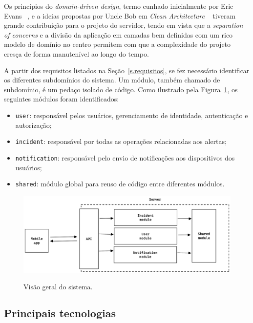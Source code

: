 Os princípios do \emph{domain-driven design}, termo cunhado inicialmente por Eric Evans ~\cite{domain-driven-design}, e a ideias propostas por Uncle Bob em \emph{Clean Architecture} ~\cite{clean-architecture} tiveram grande contribuição para o projeto do servidor, tendo em vista que a \emph{separation of concerns} e a divisão da aplicação em camadas bem definidas com um rico modelo de domínio no centro permitem com que a complexidade do projeto cresça de forma manutenível ao longo do tempo.

A partir dos requisitos listados na Seção~\ref{s.requisitos}, se fez necessário identificar os diferentes subdomínios do sistema. Um módulo, também chamado de subdomínio, é um pedaço isolado de código. Como ilustrado pela Figura~\ref{f.system_server}, os seguintes módulos foram identificados:

\begin{itemize}
	\item \texttt{user}: responsável pelos usuários, gerenciamento de identidade, autenticação e autorização;
	\item \texttt{incident}: responsável por todas as operações relacionadas aos alertas;
	\item \texttt{notification}: responsável pelo envio de notificações aos dispositivos dos usuários;
	\item \texttt{shared}: módulo global para reuso de código entre diferentes módulos.
\end{itemize}

\begin{figure}[htbp]
	\caption{\small Visão geral do sistema.}
	\centering
	\includegraphics[width=\textwidth]{../diagrams/out/system_server.png}
	\label{f.system_server}
\end{figure}

\FloatBarrier

\subsection{Principais tecnologias}

